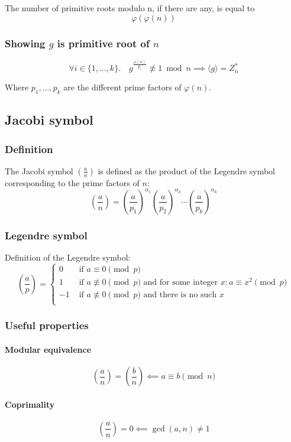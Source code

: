 \documentclass{article}
\begin{document}
The number of primitive roots modulo n, if there are any, is equal to $$φ(φ(n))$$

\subsubsection{Showing $g$ is primitive root of $n$}

$$∀i ∈ \{1,...,k\}.\quad g^{\frac{φ(n)}{p_i}} \not\equiv 1\bmod n ⟹ ⟨g⟩ = Z_n^*$$

Where $p_1,\dots,p_k$ are the different prime factors of $φ(n)$.

\subsection{Jacobi symbol}

\subsubsection{Definition}
The Jacobi symbol $(\frac{a}{n})$ is defined as the product of the Legendre symbol corresponding to the prime factors of $n$: $$(\frac{a}{n}) = (\frac{a}{p_1})^{α_1}(\frac{a}{p_2})^{α_2}\cdots(\frac{a}{p_k})^{α_k}$$

\subsubsection{Legendre symbol}
Definition of the Legendre symbol: $$(\frac{a}{p}) = \begin{cases}
	0  & \textrm{ if } a \equiv 0 \pmod p\\
	1  & \textrm{ if } a \not\equiv 0 \pmod p\textrm{ and for some integer } x: a\equiv x^2 \pmod p\\
	-1 & \textrm{ if } a \not\equiv 0 \pmod p\textrm{ and there is no such } x\\
	\end{cases}$$

\subsubsection{Useful properties}

\paragraph{Modular equivalence}
$$(\frac{a}{n}) = (\frac{b}{n}) \impliedby a ≡ b\pmod n$$
\paragraph{Coprimality}
$$(\frac{a}{n}) = 0 \impliedby \gcd(a,n) \not= 1$$
\end{document}

